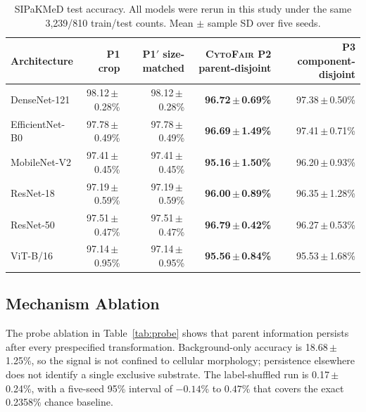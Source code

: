 \documentclass[conference]{IEEEtran}
\newcommand{\meanpm}[2]{#1\,$\pm$\,#2}
\newcommand{\protocol}[1]{\textsf{#1}}
\newcommand{\cytofair}{\textsc{CytoFair}}
\begin{document}
\begin{table}[t]
\caption{SIPaKMeD test accuracy. All models were rerun in this study under the same 3,239/810 train/test counts. Mean $\pm$ sample SD over five seeds.}
\label{tab:classification}
\centering
\scriptsize
\setlength{\tabcolsep}{7pt}
\begin{tabular}{lrrrr}
\toprule
Architecture & \protocol{P1} crop & \protocol{P1$'$} size-matched & \textbf{\cytofair{} \protocol{P2} parent-disjoint} & \protocol{P3} component-disjoint \\
\midrule
DenseNet-121 & \meanpm{98.12}{0.28}\% & \meanpm{98.12}{0.28}\% & \textbf{\meanpm{96.72}{0.69}\%} & \meanpm{97.38}{0.50}\% \\
EfficientNet-B0 & \meanpm{97.78}{0.49}\% & \meanpm{97.78}{0.49}\% & \textbf{\meanpm{96.69}{1.49}\%} & \meanpm{97.41}{0.71}\% \\
MobileNet-V2 & \meanpm{97.41}{0.45}\% & \meanpm{97.41}{0.45}\% & \textbf{\meanpm{95.16}{1.50}\%} & \meanpm{96.20}{0.93}\% \\
ResNet-18 & \meanpm{97.19}{0.59}\% & \meanpm{97.19}{0.59}\% & \textbf{\meanpm{96.00}{0.89}\%} & \meanpm{96.35}{1.28}\% \\
ResNet-50 & \meanpm{97.51}{0.47}\% & \meanpm{97.51}{0.47}\% & \textbf{\meanpm{96.79}{0.42}\%} & \meanpm{96.27}{0.53}\% \\
ViT-B/16 & \meanpm{97.14}{0.95}\% & \meanpm{97.14}{0.95}\% & \textbf{\meanpm{95.56}{0.84}\%} & \meanpm{95.53}{1.68}\% \\
\bottomrule
\end{tabular}
\end{table}

\subsection{Mechanism Ablation}
The probe ablation in Table~\ref{tab:probe} shows that parent information persists after every prespecified transformation.
Background-only accuracy is \meanpm{18.68}{1.25}\%, so the signal is not confined to cellular morphology; persistence elsewhere does not identify a single exclusive substrate.
The label-shuffled run is \meanpm{0.17}{0.24}\%, with a five-seed 95\% interval of $-0.14$\% to $0.47$\% that covers the exact 0.2358\% chance baseline.
\end{document}
